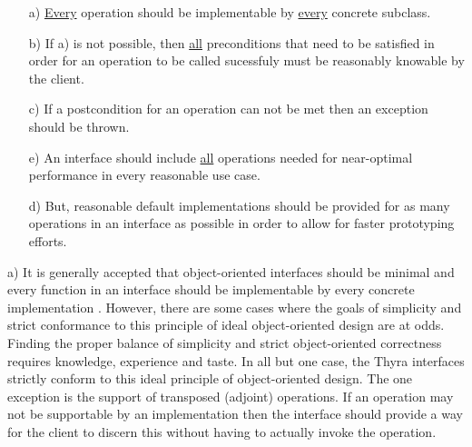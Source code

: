 \documentclass[pdf,ps2pdf,11pt]{SANDreport}
\begin{document}
\begin{enumerate}

{}\item[a)] {}\underline{Every} operation should be implementable by
{}\underline{every} concrete subclass.

{}\item[b)] If a) is not possible, then {}\underline{all} preconditions
that need to be satisfied in order for an operation to be called
sucessfuly must be reasonably knowable by the client.

{}\item[c)] If a postcondition for an operation can not be met then
an exception should be thrown.

{}\item[e)] An interface should include {}\underline{all} operations
needed for near-optimal performance in every reasonable use case.

{}\item[d)] But, reasonable default implementations should be provided
for as many operations in an interface as possible in order to allow
for faster prototyping efforts.

\end{enumerate}

a) It is generally accepted that object-oriented interfaces should be
minimal and every function in an interface should be implementable by
every concrete implementation {}\cite[Section
24.4.3]{ref:stroustrup_1997}.  However, there are some cases where the
goals of simplicity and strict conformance to this principle of ideal
object-oriented design are at odds.  Finding the proper balance of
simplicity and strict object-oriented correctness requires knowledge,
experience and taste.  In all but one case, the Thyra interfaces
strictly conform to this ideal principle of object-oriented design.
The one exception is the support of transposed (adjoint) operations.
If an operation may not be supportable by an implementation then the
interface should provide a way for the client to discern this without
having to actually invoke the operation.
\end{document}
